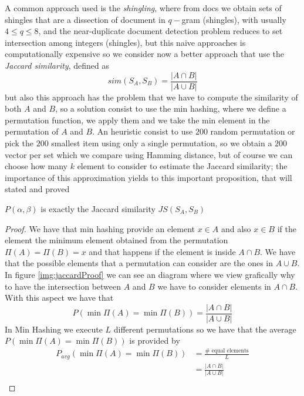     A common approach used is the \emph{shingling}, where from docs we obtain sets of shingles that are a dissection of document in $q-$gram (shingles), with usually $4 \leq q \leq 8$,
    and the near-duplicate document detection problem reduces to set intersection among integers (shingles), but this naive approaches is computationally expensive so we consider now
    a better approach that use the \emph{Jaccard similarity}, defined as 
    \[ sim(S_A, S_B) = \frac{| A \cap B|}{|A \cup B|} \]
    but also this approach has the problem that we have to compute the similarity of both $A$ and $B$, so a solution consist to use the min hashing, where we define a permutation function,
    we apply them and we take the min element in the permutation of $A$ and $B$.\newline
    An heuristic consist to use $200$ random permutation or pick the $200$ smallest item using only a single permutation, so we obtain a $200$ vector per set which we compare using Hamming distance,
    but of course we can choose how many $k$ element to consider to estimate the Jaccard similarity; the importance of this approximation yields to this important proposition, that will stated and proved
    \begin{prop}
	    $P(\alpha, \beta)$ is exactly the Jaccard similarity $JS(S_A, S_B)$
    \end{prop}
    \begin{proof}
	We have that min hashing provide an element $x \in A$ and also $x \in B$
	if the element the minimum element obtained from the permutation 
	$\Pi(A) = \Pi(B) = x$ and that happens if the element is inside 
	$A \cap B$.\newline
	We have that the possible elements that a permutation can consider are 
	the ones in $A \cup B$.\newline
	In figure \ref{img:jaccardProof} we can see an diagram where we view grafically why 
	to have the intersection between $A$ and $B$ we have to consider elements in $A \cap B$.\newline
	With this aspect we have that 
	\[ P(\min \Pi(A) = \min \Pi(B)) = \frac{|A \cap B|}{|A \cup B|} \]
	In Min Hashing we execute $L$ different permutations so we have that 
	the average $P(\min \Pi(A) = \min \Pi(B))$ is provided by
	\begin{align*}
		P_{avg}(\min \Pi(A) = \min \Pi(B)) & = \frac{\# \text{ equal elements}}{L} \\
					      & = \frac{|A \cap B|}{|A \cup B|} \\
	\end{align*}
    \end{proof}

